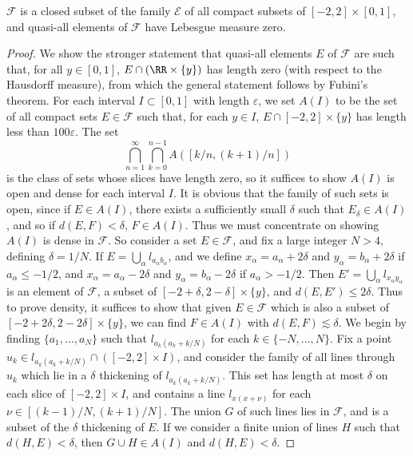 \begin{theorem}
	$\mathcal{F}$ is a closed subset of the family $\mathcal{E}$ of all compact subsets of $[-2,2] \times [0,1]$, and quasi-all elements of $\mathcal{F}$ have Lebesgue measure zero.
\end{theorem}
\begin{proof}
	We show the stronger statement that quasi-all elements $E$ of $\mathcal{F}$ are such that, for all $y \in [0,1]$, $E \cap (\RR \times \{ y \})$ has length zero (with respect to the Hausdorff measure), from which the general statement follows by Fubini's theorem. For each interval $I \subset [0,1]$ with length $\varepsilon$, we set $A(I)$ to be the set of all compact sets $E \in \mathcal{F}$ such that, for each $y \in I$, $E \cap [-2,2] \times \{ y \}$ has length less than $100 \varepsilon$. The set
	\[ \bigcap_{n = 1}^\infty \bigcap_{k = 0}^{n-1} A([k/n,(k+1)/n]) \]
	is the class of sets whose slices have length zero, so it suffices to show $A(I)$ is open and dense for each interval $I$. It is obvious that the family of such sets is open, since if $E \in A(I)$, there exists a sufficiently small $\delta$ such that $E_\delta \in A(I)$, and so if $d(E,F) < \delta$, $F \in A(I)$. Thus we must concentrate on showing $A(I)$ is dense in $\mathcal{F}$. So consider a set $E \in \mathcal{F}$, and fix a large integer $N > 4$, defining $\delta = 1/N$. If $E = \bigcup_\alpha l_{a_\alpha b_\alpha}$, and we define $x_\alpha = a_\alpha + 2\delta$ and $y_\alpha = b_\alpha + 2\delta$ if $a_\alpha \leq -1/2$, and $x_\alpha = a_\alpha - 2\delta$ and $y_\alpha = b_\alpha - 2\delta$ if $a_\alpha > -1/2$. Then $E' = \bigcup_\alpha l_{x_\alpha y_\alpha}$ is an element of $\mathcal{F}$, a subset of $[-2+\delta,2-\delta] \times \{ y \}$, and $d(E,E') \leq 2\delta$. Thus to prove density, it suffices to show that given $E \in \mathcal{F}$ which is also a subset of $[-2+2\delta,2-2\delta] \times \{ y \}$, we can find $F \in A(I)$ with $d(E,F) \lesssim \delta$. We begin by finding $\{ a_1, \dots, a_N \}$ such that $l_{a_k(a_k + k/N)}$ for each $k \in \{ -N, \dots, N \}$. Fix a point $u_k \in l_{a_k(a_k + k/N)} \cap ([-2,2] \times I)$, and consider the family of all lines through $u_k$ which lie in a $\delta$ thickening of $l_{a_k(a_k + k/N)}$. This set has length at most $\delta$ on each slice of $[-2,2] \times I$, and contains a line $l_{x(x + \nu)}$ for each $\nu \in [(k-1)/N,(k+1)/N]$. The union $G$ of such lines lies in $\mathcal{F}$, and is a subset of the $\delta$ thickening of $E$. If we consider a finite union of lines $H$ such that $d(H,E) < \delta$, then $G \cup H \in A(I)$ and $d(H,E) < \delta$.
\end{proof}

